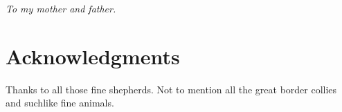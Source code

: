 \documentclass[proposal,singlespace]{umassthesis}          %
\begin{document}
\begin{dedication}              %
  \begin{center}
    \emph{To my mother and father.}
  \end{center}
\end{dedication}

%
%
%

\chapter{Acknowledgments}             %
  Thanks to all those fine shepherds. Not to mention all the great
  border collies and suchlike fine animals.
\end{document}
